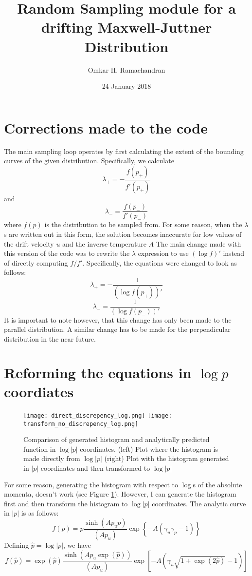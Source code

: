 \documentclass[english]{article}
\title{Random Sampling module for a drifting Maxwell-Juttner Distribution}
\author{Omkar H. Ramachandran}
\date{24 January 2018}
\begin{document}
\maketitle
\section{Corrections made to the code}
The main sampling loop operates by first calculating the extent of the bounding 
curves of the given distribution. Specifically, we calculate
$$ \lambda_{+} = -\frac{f(p_{+})}{f'(p_{+})} $$
and
$$ \lambda_{-} = \frac{f(p_{-})}{f'(p_{-})} $$
where $f(p)$ is the distribution to be sampled from. For some reason,
when the $\lambda$s are written out in this form, the solution becomes
inaccurate for low values of the drift velocity $u$ and the inverse temperature $A$
The main change made with this version of the code was to rewrite the $\lambda$ 
expression to use $(\log{f})'$ instead of directly computing $f/f'$. Specifically,
the equations were changed to look as follows:
$$ \lambda_{+} = -\frac{1}{(\log{f(p_{+})})'} $$
$$ \lambda_{-} = \frac{1}{(\log{f(p_{-})})'} $$
It is important to note however, that this change has only been made to the
parallel distribution. A similar change has to be made for the perpendicular
distribution in the near future.

\section{Reforming the equations in $\log{p}$ coordiates}
\begin{figure}[h]
	\centering
	\texttt{[image: direct\_discrepency\_log.png]}
	\texttt{[image: transform\_no\_discrepency\_log.png]}
	\caption{Comparison of generated histogram and analytically predicted function in $\log{|p|}$ coordinates. (left) Plot where the histogram is made directly from $\log{|p|}$ (right) Plot with the histogram generated in $|p|$ coordinates and then transformed to $\log{|p|}$}
	\label{fig:direct_v_transform_log}
\end{figure}
For some reason, generating the histogram with respect to $\log$s of the
absolute momenta, doesn't work (see Figure \ref{fig:direct_v_transform_log}).
However, I can generate the histogram first and then transform the histogram 
to $\log{|p|}$ coordinates. The analytic curve in $|p|$ is as follows:
$$
f\left(p\right)=p\frac{\sinh\left(Ap_{u}p\right)}{\left(Ap_{u}\right)}\exp\left\{ -A\left(\gamma_{u}\gamma_{p}-1\right)\right\} 
$$
Defining $\hat{p}=\log{|p|}$, we have
$$
f(\hat{p})=\exp{(\hat{p})}\frac{\sinh(Ap_{u}\exp{(\hat{p})})}{(Ap_{u})}\exp\left[-A\left(\gamma_{u}\sqrt{1+\exp{(2\hat{p})}}-1\right)\right] 
$$
\end{document}
